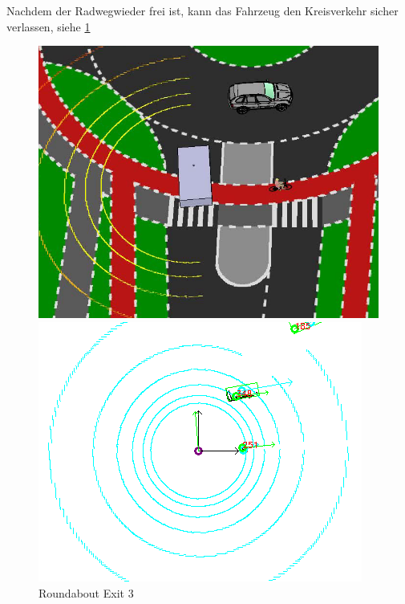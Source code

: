 \documentclass[11pt,oneside,openright]{mpreport}
\begin{document}
Nachdem der Radwegwieder frei ist, kann das Fahrzeug den Kreisverkehr sicher verlassen, siehe \cref{roundabout_exit_3}

\begin{figure}[htb]
  \caption{Roundabout Exit 3} 
    \centering
    \begin{minipage}[t]{0.49\textwidth}
        \centering
          \includegraphics[width=\textwidth]{bilder/sim11.png}
    \end{minipage}%
    \hfill
    \begin{minipage}[t]{0.49\textwidth}
        \centering
	\includegraphics[width=\textwidth]{bilder/sim12.png}
    \end{minipage}
    \label{roundabout_exit_3}
\end{figure}
\end{document}
